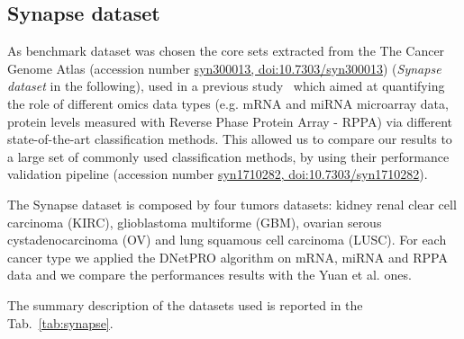 \documentclass{standalone}
\begin{document}
\subsection[Synapse]{Synapse dataset}\label{synapse:synapse}

As benchmark dataset was chosen the core sets extracted from the The Cancer Genome Atlas (accession number \href{https://www.synapse.org/#!Synapse:syn300013/wiki/27406}{syn300013, doi:10.7303/syn300013}) (\emph{Synapse dataset} in the following), used in a previous study~\cite{Yuan2014} which aimed at quantifying the role of different omics data types (e.g. mRNA and miRNA microarray data,  protein levels measured with Reverse Phase Protein Array - RPPA) via different state-of-the-art classification methods.
This allowed us to compare our results to a large set of commonly used classification methods, by using their performance validation pipeline (accession number \href{https://www.synapse.org/#!Synapse:syn1710282/wiki/27303}{syn1710282, doi:10.7303/syn1710282}).

The Synapse dataset is composed by four tumors datasets: kidney renal clear cell carcinoma (KIRC), glioblastoma multiforme (GBM), ovarian serous cystadenocarcinoma (OV) and lung squamous cell carcinoma (LUSC).
For each cancer type we applied the DNetPRO algorithm on mRNA, miRNA and RPPA data and we compare the performances results with the Yuan et al. ones.

The summary description of the datasets used is reported in the Tab.~\ref{tab:synapse}.
\end{document}
